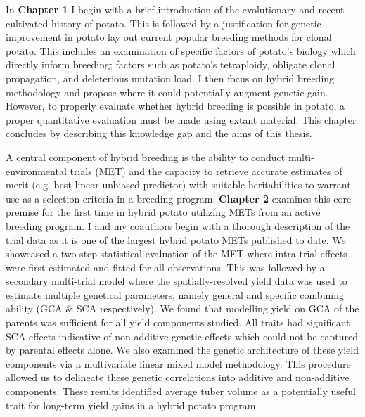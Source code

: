 In \textbf{Chapter 1} I begin with a brief introduction of the evolutionary and recent cultivated history of potato. This is followed by a justification for genetic improvement in potato lay out current popular breeding methods for clonal potato. This includes an examination of specific factors of potato's biology which directly inform breeding; factors such as potato's tetraploidy, obligate clonal propagation, and deleterious mutation load. I then focus on hybrid breeding methodology and propose where it could potentially augment genetic gain. However, to properly evaluate whether hybrid breeding is possible in potato, a proper quantitative evaluation must be made using extant material. This chapter concludes by describing this knowledge gap and the aims of this thesis.

A central component of hybrid breeding is the ability to conduct multi-environmental trials (MET) and the capacity to retrieve accurate estimates of merit (e.g. best linear unbiased predictor) with suitable heritabilities to warrant use as a selection criteria in a breeding program. \textbf{Chapter 2} examines this core premise for the first time in hybrid potato utilizing METs from an active breeding program. I and my coauthors begin with a thorough description of the trial data as it is one of the largest hybrid potato METs published to date. We showcased a two-step statistical evaluation of the MET where intra-trial effects were first estimated and fitted for all observations. This was followed by a secondary multi-trial model where the spatially-resolved yield data was used to estimate multiple genetical parameters, namely general and specific combining ability (GCA \& SCA respectively). We found that modelling yield on GCA of the parents was sufficient for all yield components studied. All traits had significant SCA effects indicative of non-additive genetic effects which could not be captured by parental effects alone. We also examined the genetic architecture of these yield components via a multivariate linear mixed model methodology. This procedure allowed us to delineate these genetic correlations into additive and non-additive components. These results identified average tuber volume as a potentially useful trait for long-term yield gains in a hybrid potato program.

